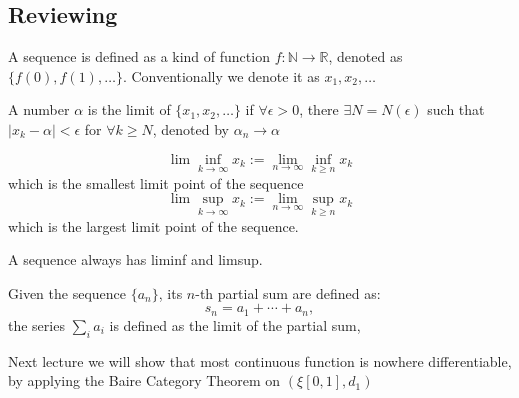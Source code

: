 \subsection{Reviewing}
\begin{definition}[Sequence]
A sequence is defined as a kind of function $f:\mathbb{N}\to\mathbb{R}$, denoted as $\{f(0), f(1),\dots\}$. Conventionally we denote it as $x_1,x_2,\dots$
\end{definition}
\begin{definition}[Limit]
A number $\alpha$ is the limit of $\{x_1,x_2,\dots\}$ if $\forall\epsilon>0$, there $\exists N = N(\epsilon)$ such that $|x_k-\alpha|<\epsilon$ for $\forall k\ge N$, denoted by $\alpha_n\to\alpha$
\end{definition}
\begin{definition}
\[
\lim\inf_{k\to\infty}x_k :=\lim_{n\to\infty}\inf_{k\ge n}x_k
\]
which is the smallest limit point of the sequence
\[
\lim\sup_{k\to\infty}x_k :=\lim_{n\to\infty}\sup_{k\ge n}x_k
\]
which is the largest limit point of the sequence.
\end{definition}
A sequence always has liminf and limsup.
\begin{definition}
Given the sequence $\{a_n\}$, its $n$-th partial sum are defined as:
\[
s_n = a_1+\cdots+a_n,
\]
the series $\sum_ia_i$ is defined as the limit of the partial sum,
\end{definition}

Next lecture we will show that most continuous function is nowhere differentiable, by applying the Baire Category Theorem on $(\xi[0,1],d_1)$
















